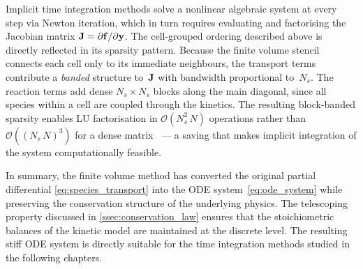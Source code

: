 Implicit time integration methods solve a nonlinear algebraic system at every step via Newton iteration, which in turn requires evaluating and factorising the Jacobian matrix \(\mathbf{J} = \partial \mathbf{f} / \partial \mathbf{y}\). The cell-grouped ordering described above is directly reflected in its sparsity pattern. Because the finite volume stencil connects each cell only to its immediate neighbours, the transport terms contribute a \emph{banded} structure to~\(\mathbf{J}\) with bandwidth proportional to~\(N_s\). The reaction terms add dense \(N_s \times N_s\) blocks along the main diagonal, since all species within a cell are coupled through the kinetics. The resulting block-banded sparsity enables LU factorisation in \(\mathcal{O}(N_s^{2}\,N)\) operations rather than \(\mathcal{O}((N_s\,N)^{3})\) for a dense matrix~\cite{HairerWanner1996} --- a saving that makes implicit integration of the system computationally feasible.

In summary, the finite volume method has converted the original partial differential \cref{eq:species_transport} into the ODE system~\eqref{eq:ode_system} while preserving the conservation structure of the underlying physics. The telescoping property discussed in \cref{ssec:conservation_law} ensures that the stoichiometric balances of the kinetic model are maintained at the discrete level. The resulting stiff ODE system is directly suitable for the time integration methods studied in the following chapters.
